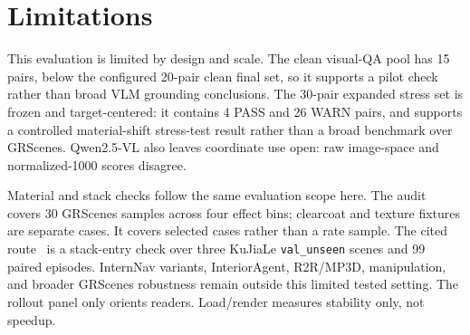 \section*{Limitations}

This evaluation is limited by design and scale. The clean visual-QA pool has 15
pairs, below the configured 20-pair clean final set, so it supports a pilot
check rather than broad VLM grounding conclusions. The 30-pair expanded stress set is frozen and
target-centered: it contains 4 PASS and 26 WARN pairs, and supports a controlled
material-shift stress-test result rather than a broad benchmark over GRScenes.
\mbox{Qwen2.5-VL} also leaves coordinate use open: raw image-space and
normalized-1000 scores disagree.

Material and stack checks follow the same evaluation scope here. The audit covers 30
GRScenes samples across four effect bins; clearcoat and texture fixtures are
separate cases. It covers selected cases rather than a rate sample. The
cited route~\cite{Wei2026Ground} is a stack-entry check over three KuJiaLe
\texttt{val\_unseen} scenes and 99 paired episodes. InternNav variants,
\mbox{InteriorAgent}, R2R/MP3D, \mbox{manipulation}, and broader GRScenes
robustness remain outside this limited tested setting. The rollout panel only orients readers. Load/render
measures stability only, not speedup.
